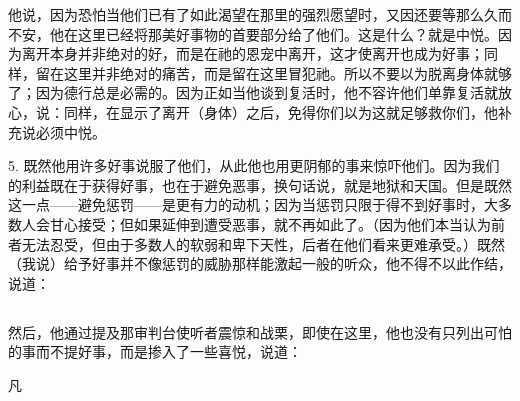 \par

他说，因为恐怕当他们已有了如此渴望在那里的强烈愿望时，又因还要等那么久而不安，他在这里已经将那美好事物的首要部分给了他们。这是什么？就是中悦。因为离开本身并非绝对的好，而是在祂的恩宠中离开，这才使离开也成为好事；同样，留在这里并非绝对的痛苦，而是留在这里冒犯祂。所以不要以为脱离身体就够了；因为德行总是必需的。因为正如当他谈到复活时，他不容许他们单靠复活就放心，说：同样，在显示了离开（身体）之后，免得你们以为这就足够救你们，他补充说必须中悦。\par

5. 既然他用许多好事说服了他们，从此他也用更阴郁的事来惊吓他们。因为我们的利益既在于获得好事，也在于避免恶事，换句话说，就是地狱和天国。但是既然这一点——避免惩罚——是更有力的动机；因为当惩罚只限于得不到好事时，大多数人会甘心接受；但如果延伸到遭受恶事，就不再如此了。（因为他们本当认为前者无法忍受，但由于多数人的软弱和卑下天性，后者在他们看来更难承受。）既然（我说）给予好事并不像惩罚的威胁那样能激起一般的听众，他不得不以此作结，说道：\par


\subsection{}

\par

然后，他通过提及那审判台使听者震惊和战栗，即使在这里，他也没有只列出可怕的事而不提好事，而是掺入了一些喜悦，说道：\par

凡 \par

